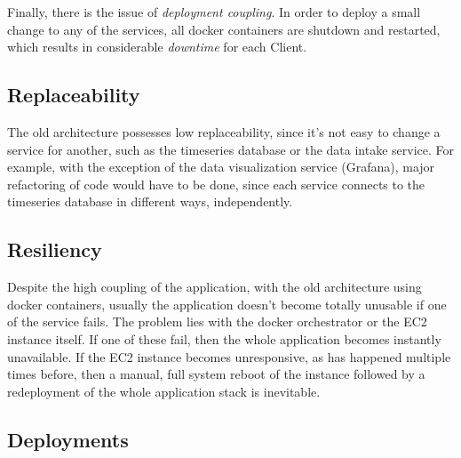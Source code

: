 Finally, there is the issue of \textit{deployment coupling}. In order to deploy a small change to any of the services, all docker containers are shutdown and restarted, which results in considerable \textit{downtime} for each Client.


\subsection{Replaceability}\label{methodology:sss:replaceability}

The old architecture possesses low replaceability, since it's not easy to change a service for another, such as the timeseries database or the data intake service. For example, with the exception of the data visualization service (Grafana), major refactoring of code would have to be done, since each service connects to the timeseries database in different ways, independently.

\subsection{Resiliency}\label{methodology:sss:resiliency}

Despite the high coupling of the application, with the old architecture using docker containers, usually the application doesn't become totally unusable if one of the service fails. The problem lies with the docker orchestrator or the EC2 instance itself. If one of these fail, then the whole application becomes instantly unavailable. If the EC2 instance becomes unresponsive, as has happened multiple times before, then a manual, full system reboot of the instance followed by a redeployment of the whole application stack is inevitable. 

\subsection{Deployments}\label{methodology:sss:deployments}

